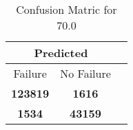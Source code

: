\begin{table}[] 
\caption{Confusion Matric for 70.0} 
\label{Table: Prediction Accuracy-DMD70.0OnlySunEKF-resetReflectionEKF-top2perfectNoFailurePrediction-Reflection} 
\centering 
\begin{tabular} 
 {@{}ccc@{}} 
\toprule 
\multicolumn{2}{c}{\textbf{Predicted}}
 \\ \midrule 
\multicolumn{1}{|c|}{Failure} & 
\multicolumn{1}{c|}{No Failure}
 \\ \midrule 
\multicolumn{1}{|c|}{\color{green}\textbf{123819}} & 
\multicolumn{1}{c|}{\color{red}\textbf{1616}}
 \\ \midrule 
\multicolumn{1}{|c|}{\color{red}\textbf{1534}} & 
\multicolumn{1}{c|}{\color{green}\textbf{43159}}
 \\ \bottomrule 
\end{tabular} 
\end{table} 

